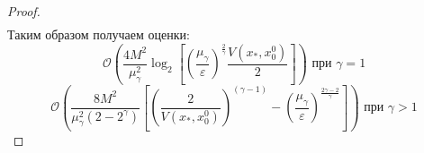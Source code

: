 \begin{proof}
\begin{equation}
\begin{aligned}
       \end{aligned}
       \end{equation}
       Таким образом получаем оценки:
       \begin{equation}
           \mathcal{O} \left( \frac{4 M^2}{\mu_{\gamma}^2} \log_2{\left[\left(\frac{\mu_{\gamma}}{\varepsilon}\right)^{\frac{2}{\gamma}} \frac{V(x_*, x_0^0)}{2}\right]}\right) \text{ при } \gamma = 1
       \end{equation}
       \begin{equation}
           \mathcal{O} \left( \frac{8  M^2}{\mu_{\gamma}^2 (2 - 2^{\gamma})} \left[ \left(\frac{2}{V(x_*, x_0^0)}\right)^{(\gamma - 1)}  - \left(\frac{\mu_{\gamma}}{\varepsilon}\right)^{\frac{2\gamma - 2}{\gamma}} \right]\right) \text{ при } \gamma > 1
       \end{equation}
       

\end{proof}
